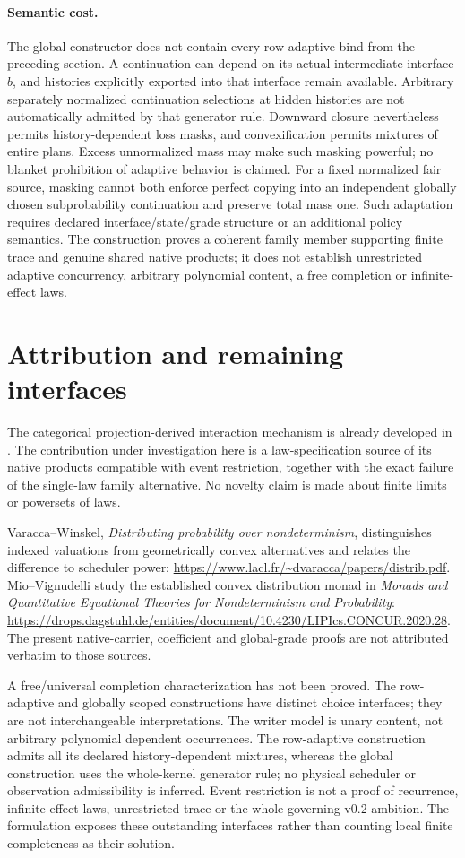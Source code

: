 \documentclass{article}
\begin{document}
\paragraph{Semantic cost.} The global constructor does not contain every row-adaptive bind from the preceding section. A continuation can depend on its actual intermediate interface $b$, and histories explicitly exported into that interface remain available. Arbitrary separately normalized continuation selections at hidden histories are not automatically admitted by that generator rule. Downward closure nevertheless permits history-dependent loss masks, and convexification permits mixtures of entire plans. Excess unnormalized mass may make such masking powerful; no blanket prohibition of adaptive behavior is claimed. For a fixed normalized fair source, masking cannot both enforce perfect copying into an independent globally chosen subprobability continuation and preserve total mass one. Such adaptation requires declared interface/state/grade structure or an additional policy semantics. The construction proves a coherent family member supporting finite trace and genuine shared native products; it does not establish unrestricted adaptive concurrency, arbitrary polynomial content, a free completion or infinite-effect laws.

\section{Attribution and remaining interfaces}
The categorical projection-derived interaction mechanism is already developed in
.
The contribution under investigation here is a law-specification source of its native products compatible with event restriction, together with the exact failure of the single-law family alternative. No novelty claim is made about finite limits or powersets of laws.

Varacca--Winskel, \emph{Distributing probability over nondeterminism}, distinguishes indexed valuations from geometrically convex alternatives and relates the difference to scheduler power:
\url{https://www.lacl.fr/~dvaracca/papers/distrib.pdf}.
Mio--Vignudelli study the established convex distribution monad in \emph{Monads and Quantitative Equational Theories for Nondeterminism and Probability}:
\url{https://drops.dagstuhl.de/entities/document/10.4230/LIPIcs.CONCUR.2020.28}.
The present native-carrier, coefficient and global-grade proofs are not attributed verbatim to those sources.

A free/universal completion characterization has not been proved. The row-adaptive and globally scoped constructions have distinct choice interfaces; they are not interchangeable interpretations. The writer model is unary content, not arbitrary polynomial dependent occurrences. The row-adaptive construction admits all its declared history-dependent mixtures, whereas the global construction uses the whole-kernel generator rule; no physical scheduler or observation admissibility is inferred. Event restriction is not a proof of recurrence, infinite-effect laws, unrestricted trace or the whole governing v0.2 ambition. The formulation exposes these outstanding interfaces rather than counting local finite completeness as their solution.
\end{document}
